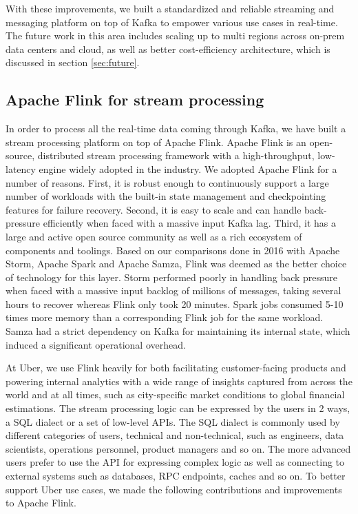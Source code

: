 \documentclass[sigconf]{acmart}
\begin{document}
\bigskip

With these improvements, we built a standardized and reliable streaming and messaging platform on top of Kafka to empower various use cases in real-time. The future work in this area includes scaling up to multi regions across on-prem data centers and cloud, as well as better cost-efficiency architecture, which is discussed in section \ref{sec:future}.

\subsection{Apache Flink for stream processing} \label{sec:flink}

In order to process all the real-time data coming through Kafka, we have built a stream processing platform on top of Apache Flink\cite{katsifodimos2016apache}. Apache Flink is an open-source, distributed stream processing framework with a high-throughput, low-latency engine widely adopted in the industry. We adopted Apache Flink for a number of reasons. First, it is robust enough to continuously support a large number of workloads with the built-in state management and checkpointing features for failure recovery. Second, it is easy to scale and can handle back-pressure efficiently when faced with a massive input Kafka lag. Third, it has a large and active open source community as well as a rich ecosystem of components and toolings. Based on our comparisons done in 2016 with Apache Storm, Apache Spark and Apache Samza, Flink was deemed as the better choice of technology for this layer. Storm performed poorly in handling back pressure when faced with a massive input backlog of millions of messages, taking several hours to recover whereas Flink only took 20 minutes. Spark jobs consumed 5-10 times more memory than a corresponding Flink job for the same workload. Samza had a strict dependency on Kafka for maintaining its internal state, which induced a significant operational overhead.

 
At Uber, we use Flink heavily for both facilitating customer-facing products and powering internal analytics with a wide range of insights captured from across the world and at all times, such as city-specific market conditions to global financial estimations. The stream processing logic can be expressed by the users in 2 ways, a SQL dialect or a set of low-level APIs. The SQL dialect is commonly used by different categories of users, technical and non-technical, such as engineers, data scientists, operations personnel, product managers and so on. The more advanced users prefer to use the API for expressing complex logic as well as connecting to external systems such as databases, RPC endpoints, caches and so on. To better support Uber use cases, we made the following contributions and improvements to Apache Flink.
\end{document}
